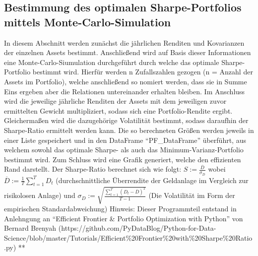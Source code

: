 \documentclass[paper=landscape]{scrartcl}
\begin{document}
    \hypertarget{bestimmung-des-optimalen-sharpe-portfolios-mittels-monte-carlo-simulation}{%
\subsection{Bestimmung des optimalen Sharpe-Portfolios mittels
Monte-Carlo-Simulation}\label{bestimmung-des-optimalen-sharpe-portfolios-mittels-monte-carlo-simulation}}

In diesem Abschnitt werden zunächst die jährlichen Renditen und
Kovarianzen der einzelnen Assets bestimmt. Anschließend wird auf Basis
dieser Informationen eine Monte-Carlo-Siumulation durchgeführt durch
welche das optimale Sharpe-Portfolio bestimmt wird. Hierfür werden n
Zufallszahlen gezogen (n = Anzahl der Assets im Portfolio), welche
anschließend so nomiert werden, dass sie in Summe Eins ergeben aber die
Relationen untereinander erhalten bleiben. Im Anschluss wird die
jeweilige jährliche Renditen der Assets mit dem jeweiligen zuvor
ermittelten Gewicht multipliziert, sodass sich eine Portfolio-Rendite
ergibt. Gleichermaßen wird die dazugehörige Volatilität bestimmt, sodass
daraufhin der Sharpe-Ratio ermittelt werden kann. Die so berechneten
Größen werden jeweils in einer Liste gespeichert und in den DataFrame
``PF\_DataFrame'' überführt, aus welchem sowohl das optimale Sharpe- als
auch das Minimum-Varianz-Portfolio bestimmt wird. Zum Schluss wird eine
Grafik generiert, welche den effizienten Rand darstellt. Der
Sharpe-Ratio berechnet sich wie folgt:
\(S := \frac{\overline{D}}{\sigma_D}\) wobei
\(\overline{D} := \frac{1}{T} \sum_{t=1}^{T} D_t\) (durchschnittliche
Überrendite der Geldanlage im Vergleich zur risikolosen Anlage) und
\(\sigma_D := \sqrt{\frac{\sum_{t=1}^T \left(D_t - \overline{D}\right)^2}{T - 1}}\)
(Die Volatilität im Form der empirischen Standardabweichung) Hinweis:
Dieser Programmteil entstand in Anlehngung an ``Efficient Frontier \&
Portfolio Optimization with Python'' von Bernard Brenyah
(https://github.com/PyDataBlog/Python-for-Data-Science/blob/master/Tutorials/Efficient\%20Frontier\%20with\%20Sharpe\%20Ratio.py)
**
\end{document}
